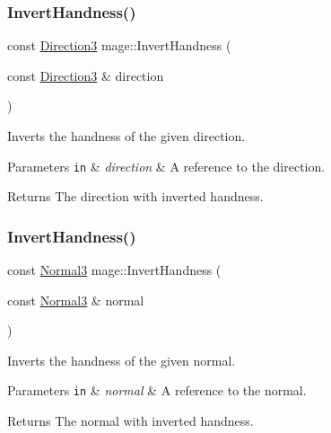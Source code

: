 \subsubsection{\texorpdfstring{Invert\+Handness()}{InvertHandness()}\hspace{0.1cm}{\footnotesize\ttfamily [3/4]}}
{\footnotesize\ttfamily const \hyperlink{structmage_1_1_direction3}{Direction3} mage\+::\+Invert\+Handness (\begin{DoxyParamCaption}\item[{const \hyperlink{structmage_1_1_direction3}{Direction3} \&}]{direction }\end{DoxyParamCaption})\hspace{0.3cm}{\ttfamily [noexcept]}}

Inverts the handness of the given direction.


\begin{DoxyParams}[1]{Parameters}
\mbox{\tt in}  & {\em direction} & A reference to the direction. \\
\hline
\end{DoxyParams}
\begin{DoxyReturn}{Returns}
The direction with inverted handness. 
\end{DoxyReturn}
\hypertarget{namespacemage_ae62ff8d811ab629a170869ec8a607110}{}\label{namespacemage_ae62ff8d811ab629a170869ec8a607110} 
\subsubsection{\texorpdfstring{Invert\+Handness()}{InvertHandness()}\hspace{0.1cm}{\footnotesize\ttfamily [4/4]}}
{\footnotesize\ttfamily const \hyperlink{structmage_1_1_normal3}{Normal3} mage\+::\+Invert\+Handness (\begin{DoxyParamCaption}\item[{const \hyperlink{structmage_1_1_normal3}{Normal3} \&}]{normal }\end{DoxyParamCaption})\hspace{0.3cm}{\ttfamily [noexcept]}}

Inverts the handness of the given normal.


\begin{DoxyParams}[1]{Parameters}
\mbox{\tt in}  & {\em normal} & A reference to the normal. \\
\hline
\end{DoxyParams}
\begin{DoxyReturn}{Returns}
The normal with inverted handness. 
\end{DoxyReturn}
\hypertarget{namespacemage_ad1df9b8a27dd30528717777fd0c9c3db}{}\label{namespacemage_ad1df9b8a27dd30528717777fd0c9c3db} 
